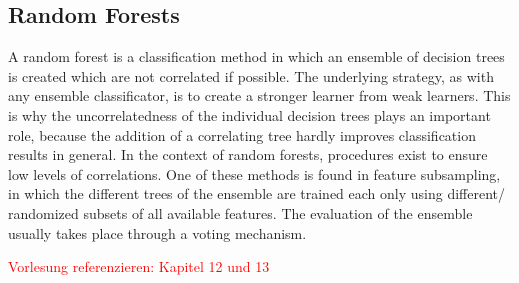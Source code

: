 \subsection{Random Forests}

A random forest is a classification method in which an ensemble of decision trees is created which are not correlated if possible. The underlying strategy, as with any ensemble classificator, is to create a stronger learner from weak learners. This is why the uncorrelatedness of the individual decision trees plays an important role, because the addition of a correlating tree hardly improves classification results in general. In the context of random forests, procedures exist to ensure low levels of correlations. One of these methods is found in feature subsampling, in which the different trees of the ensemble are trained each only using different/ randomized subsets of all available features. The evaluation of the ensemble usually takes place through a voting mechanism.

\textcolor{red}{Vorlesung referenzieren: Kapitel 12 und 13}
